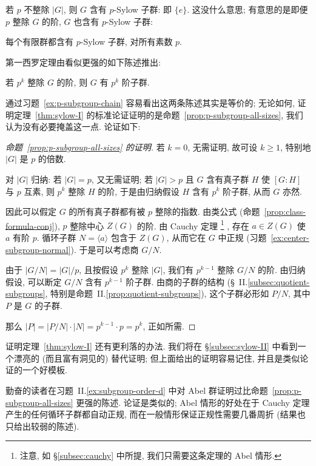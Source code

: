 若 $p$ 不整除 $|G|$, 则 $G$ 含有 $p$-Sylow 子群: 即 $\{e\}$. 这没什么意思; 有意思的是即便 $p$ 整除 $G$ 的阶, $G$ 也含有 $p$-Sylow 子群:

\begin{theorem}[第一西罗定理]
\label{thm:sylow-I}
每个有限群都含有 $p$-Sylow 子群, 对所有素数 $p$.
\end{theorem}

第一西罗定理由看似更强的如下陈述推出:

\begin{proposition}
\label{prop:p-subgroup-all-sizes}
若 $p^k$ 整除 $G$ 的阶, 则 $G$ 有 $p^k$ 阶子群.
\end{proposition}

通过习题~\ref{ex:p-subgroup-chain} 容易看出这两条陈述其实是等价的; 无论如何, 证明定理~\ref{thm:sylow-I} 的标准论证证明的是命题~\ref{prop:p-subgroup-all-sizes}, 我们认为没有必要掩盖这一点. 论证如下:

\begin{proof}[命题~\ref{prop:p-subgroup-all-sizes} 的证明]
若 $k = 0$, 无需证明, 故可设 $k \geq 1$, 特别地 $|G|$ 是 $p$ 的倍数.

对 $|G|$ 归纳: 若 $|G| = p$, 又无需证明; 若 $|G| > p$ 且 $G$ 含有真子群 $H$ 使 $[G:H]$ 与 $p$ 互素, 则 $p^k$ 整除 $H$ 的阶, 于是由归纳假设 $H$ 含有 $p^k$ 阶子群, 从而 $G$ 亦然.

因此可以假定 $G$ 的所有真子群都有被 $p$ 整除的指数. 由类公式 (命题~\ref{prop:class-formula-conj}), $p$ 整除中心 $Z(G)$ 的阶. 由 Cauchy 定理%
\footnote{注意, 如 \S\ref{subsec:cauchy} 中所提, 我们只需要这条定理的 Abel 情形.}%
, 存在 $a \in Z(G)$ 使 $a$ 有阶 $p$. 循环子群 $N = \langle a \rangle$ 包含于 $Z(G)$, 从而它在 $G$ 中正规 (习题~\ref{ex:center-subgroup-normal}). 于是可以考虑商 $G/N$.

由于 $|G/N| = |G|/p$, 且按假设 $p^k$ 整除 $|G|$, 我们有 $p^{k-1}$ 整除 $G/N$ 的阶. 由归纳假设, 可以断定 $G/N$ 含有 $p^{k-1}$ 阶子群. 由商的子群的结构 (\S~II.\ref{subsec:quotient-subgroups}, 特别是命题~II.\ref{prop:quotient-subgroups}), 这个子群必形如 $P/N$, 其中 $P$ 是 $G$ 的子群.

那么 $|P| = |P/N| \cdot |N| = p^{k-1} \cdot p = p^k$, 正如所需.
\end{proof}

证明定理~\ref{thm:sylow-I} 还有更利落的办法. 我们将在 \S\ref{subsec:sylow-II} 中看到一个漂亮的 (而且富有洞见的) 替代证明; 但上面给出的证明容易记住, 并且是类似论证的一个好模板.

\begin{remark}
\label{rem:sylow-abelian}
勤奋的读者在习题~II.\ref{ex:subgroup-order-d} 中对 Abel 群证明过比命题~\ref{prop:p-subgroup-all-sizes} 更强的陈述. 论证是类似的; Abel 情形的好处在于 Cauchy 定理产生的任何循环子群都自动正规, 而在一般情形保证正规性需要几番周折 (结果也只给出较弱的陈述).
\end{remark}

